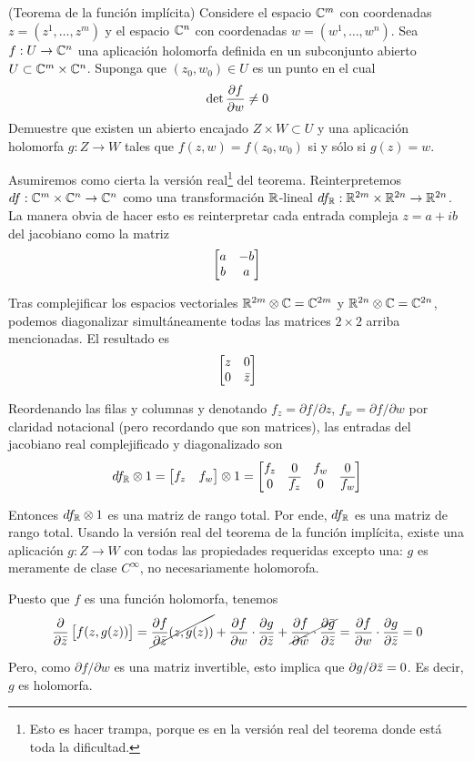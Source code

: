 \begin{exercise}
(Teorema de la función implícita) Considere el espacio $\mathbb C^m$ con coordenadas $z = (z^1, \dots, z^m)$ y el espacio $\mathbb C^n$ con coordenadas $w = (w^1, \dots, w^n)$. Sea $f : U \to \mathbb C^n$ una aplicación holomorfa definida en un subconjunto abierto $U \subset \mathbb C^m \times \mathbb C^n$. Suponga que $(z_0, w_0) \in U$ es un punto en el cual
$$\det \dfrac {\partial f} {\partial w} \ne 0$$
Demuestre que existen un abierto encajado $Z \times W \subset U$ y una aplicación holomorfa $g : Z \to W$ tales que $f(z, w) = f(z_0, w_0)$ si y sólo si $g(z) = w$.
\end{exercise}

\begin{solution}
Asumiremos como cierta la versión real\footnote{Esto es hacer trampa, porque es en la versión real del teorema donde está toda la dificultad.} del teorema. Reinterpretemos $df : \mathbb C^m \times \mathbb C^n \to \mathbb C^n$ como una transformación $\mathbb R$-lineal $df_\mathbb R : \mathbb R^{2m} \times \mathbb R^{2n} \to \mathbb R^{2n}$. La manera obvia de hacer esto es reinterpretar cada entrada compleja $z = a + ib$ del jacobiano como la matriz
$$\begin{bmatrix} a & -b \\ b & a \end{bmatrix}$$

Tras complejificar los espacios vectoriales $\mathbb R^{2m} \otimes \mathbb C = \mathbb C^{2m}$ y $\mathbb R^{2n} \otimes \mathbb C = \mathbb C^{2n}$, podemos diagonalizar simultáneamente todas las matrices $2 \times 2$ arriba mencionadas. El resultado es
$$\begin{bmatrix} z & 0 \\ 0 & \bar z \end{bmatrix}$$

Reordenando las filas y columnas y denotando $f_z = \partial f / \partial z$, $f_w = \partial f / \partial w$ por claridad notacional (pero recordando que son matrices), las entradas del jacobiano real complejificado y diagonalizado son
$$df_\mathbb R \otimes 1 = \begin{bmatrix} f_z & f_w \end{bmatrix} \otimes 1 = \begin{bmatrix} f_z & 0 & f_w & 0 \\ 0 & \overline {f_z} & 0 & \overline {f_w} \end{bmatrix}$$

Entonces $df_\mathbb R \otimes 1$ es una matriz de rango total. Por ende, $df_\mathbb R$ es una matriz de rango total. Usando la versión real del teorema de la función implícita, existe una aplicación $g : Z \to W$ con todas las propiedades requeridas excepto una: $g$ es meramente de clase $C^\infty$, no necesariamente holomorofa.

Puesto que $f$ es una función holomorfa, tenemos
$$\dfrac {\partial } {\partial \bar z} \begin{bmatrix}  f(z, g(z))  \end{bmatrix} = \cancel {\dfrac {\partial f} {\partial \bar z} (z, g(z))} + \dfrac {\partial f} {\partial w} \cdot \dfrac {\partial g} {\partial \bar z} + \cancel {\dfrac {\partial f} {\partial \bar w} \cdot \dfrac {\partial \bar g} {\partial \bar z}} = \dfrac {\partial f} {\partial w} \cdot \dfrac {\partial g} {\partial \bar z} = 0$$

Pero, como $\partial f/\partial w$ es una matriz invertible, esto implica que $\partial g/\partial \bar z = 0$. Es decir, $g$ es holomorfa.
\end{solution}
